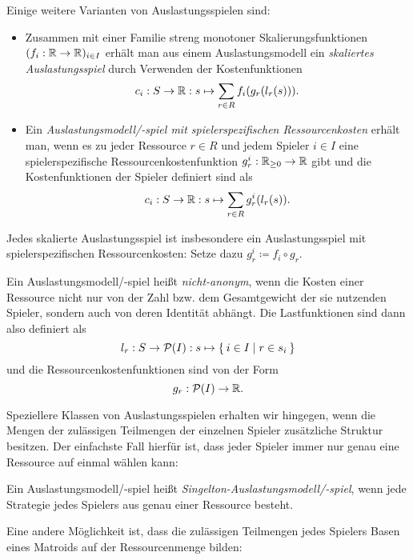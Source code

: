 Einige weitere Varianten von Auslastungsspielen sind:

\begin{defn}\label{def:weitereAuslastungsspiel}
	\begin{itemize}
		\item Zusammen mit einer Familie streng monotoner Skalierungsfunktionen $(f_i: \mathbb{R} \to \mathbb{R})_{i\in I}$ erhält man aus einem Auslastungsmodell ein \emph{skaliertes Auslastungsspiel} durch Verwenden der Kostenfunktionen
			\[c_i: S \to \mathbb{R}: s \mapsto \sum_{r \in R} f_i(g_r(l_r(s))). \]
		\item Ein \emph{Auslastungsmodell/-spiel mit spielerspezifischen Ressourcenkosten} erhält man, wenn es zu jeder Ressource $r \in R$ und jedem Spieler $i \in I$ eine spielerspezifische Ressourcenkostenfunktion $g_r^i: \mathbb{R}_{\geq 0} \to \mathbb{R}$ gibt und die Kostenfunktionen der Spieler definiert sind als
			\[c_i: S \to \mathbb{R}: s \mapsto \sum_{r \in R} g_r^i(l_r(s)).\]
	\end{itemize}
\end{defn}

\begin{bem}
	Jedes skalierte Auslastungsspiel ist insbesondere ein Auslastungsspiel mit spielerspezifischen Ressourcenkosten: Setze dazu $g_r^i \coloneqq f_i \circ g_r$.
\end{bem}

\begin{defn}
	Ein Auslastungsmodell/-spiel heißt \emph{nicht-anonym}, wenn die Kosten einer Ressource nicht nur von der Zahl bzw. dem Gesamtgewicht der sie nutzenden Spieler, sondern auch von deren Identität abhängt. Die Lastfunktionen sind dann also definiert als
		\[l_r: S \to \mathcal{P}(I): s \mapsto \Set{i \in I | r \in s_i }\]
	und die Ressourcenkostenfunktionen sind von der Form
		\[g_r: \mathcal{P}(I) \to \mathbb{R}. \]
\end{defn}

Speziellere Klassen von Auslastungsspielen erhalten wir hingegen, wenn die Mengen der zulässigen Teilmengen der einzelnen Spieler zusätzliche Struktur besitzen. Der einfachste Fall hierfür ist, dass jeder Spieler immer nur genau eine Ressource auf einmal wählen kann:

\begin{defn}
	Ein Auslastungsmodell/-spiel heißt \emph{Singelton-Auslastungsmodell/-spiel}, wenn jede Strategie jedes Spielers aus genau einer Ressource besteht.
\end{defn}

Eine andere Möglichkeit ist, dass die zulässigen Teilmengen jedes Spielers Basen eines Matroids auf der Ressourcenmenge bilden:

